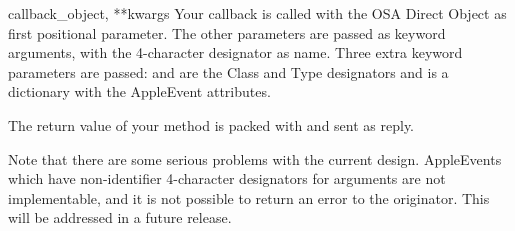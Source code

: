 \begin{methoddesc}[AEServer]{callback}{_object, **kwargs}
Your callback is called with the OSA Direct Object as first positional
parameter. The other parameters are passed as keyword arguments, with
the 4-character designator as name. Three extra keyword parameters are
passed:  and  are the Class and Type
designators and  is a dictionary with the AppleEvent
attributes.

The return value of your method is packed with
 and sent as reply.
\end{methoddesc}

Note that there are some serious problems with the current
design. AppleEvents which have non-identifier 4-character designators
for arguments are not implementable, and it is not possible to return
an error to the originator. This will be addressed in a future
release.
